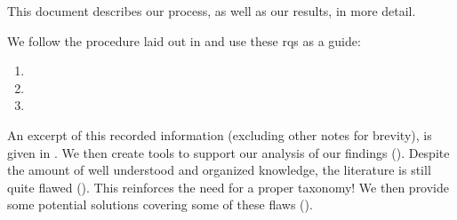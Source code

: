 This document describes our process, as well as our results, in more detail.

We follow the procedure laid out in  and use these \acfp{rq}
as a guide:
\begin{enumerate}
    \item \rqatext{}
    \item \rqbtext{}
    \item \rqctext{}
\end{enumerate}
\ifnotpaper An excerpt of this recorded information (excluding other notes for
    brevity), is given in . \fi We then
create tools to support our analysis of our findings ().
Despite the amount of well understood and organized knowledge, the literature
is still quite flawed (). This reinforces the need for a proper
taxonomy! We then provide some potential solutions covering some of these
flaws ().

\ifnotpaper
    \begin{landscape}
        
    \end{landscape}
\else
    \begin{table*}[t!]
        \ieeeCatsTable{}
    \end{table*}
\fi
